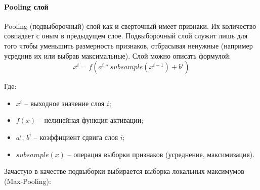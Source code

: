 \paragraph{Pooling слой}

Pooling (подвыборочный) слой как и сверточный имеет признаки. Их количество совпадает с оным в предыдущем слое. Подвыборочный слой служит лишь для того чтобы уменьшить размерность признаков, отбрасывая ненужные (например усреднив их или выбрав максимальные). Слой можно описать формулой:
$$
x^i = f(a^i*subsample(x^{i-1})+b^i)
$$

Где:
\begin{itemize}
    \item $x^i$ -- выходное значение слоя $i$;
    \item $f(x)$ -- нелинейная функция активации;
    \item $a^i$, $b^i$ -- коэффициент сдвига слоя $i$;
    \item $subsample(x)$ -- операция выборки признаков (усреднение, максимизация).
\end{itemize}

Зачастую в качестве подвыборки выбирается выборка локальных максимумов (Max-Pooling):

